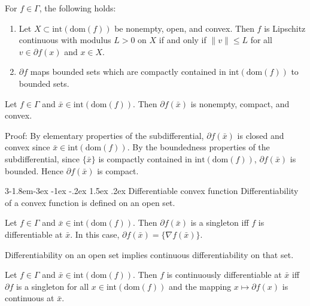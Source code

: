 \documentclass{tufte-handout}
\makeatletter
\renewcommand{\subsection}{\@startsection{subsection}%
    {3}{-1.8em}{-3ex \@plus -1ex \@minus -.2ex}%
    {1.5ex \@plus .2ex}
    {\hspace*{-5.5em}\fcolorbox{ltblue}{ltblue}{\parbox[c][1.0ex][b]{4em}{\phantom{space}}}
    \normalfont\large\itshape\color{ltblue}}}
\makeatother
\begin{document}
\begin{Theorem}
    For \( f\in \Gamma \), the following holds:
    \begin{enumerate}
        \item Let \(X \subset \text{int}(\text{dom}(f))\) be nonempty, open, and convex. Then \( f \)
        is Lipschitz continuous with modulus \( L >0 \) on \( X \) if and only if \( \|v\| \leq L \) for all 
        \( v \in \partial f(x) \) and \( x \in X \).
        \item \(\partial f\) maps bounded sets which are compactly contained in \( \text{int}(\text{dom}(f)) \) to bounded sets.
    \end{enumerate}
\end{Theorem}

\begin{Corollary}
    Let \( f\in \Gamma \) and \( \bar x \in \text{int}(\text{dom}(f)) \). Then \( \partial f(\bar x) \) is nonempty, compact, and convex.
\end{Corollary}
Proof: By elementary properties of the subdifferential, \( \partial f(\bar x) \) is closed and convex since 
\( \bar x \in \text{int}(\text{dom}(f)) \). By the boundedness properties of the subdifferential, 
since \( \{\bar x\} \) is compactly contained in \( \text{int}(\text{dom}(f)) \), 
\( \partial f(\bar x) \) is bounded. Hence \( \partial f(\bar x) \) is compact.
\hfill\qedsymbol


\subsection{Differentiable convex function}
Differentiability of a convex function is defined on an open set.
\begin{Theorem}
    Let \( f\in \Gamma \) and \( \bar x \in \text{int}(\text{dom}(f)) \). Then
    \( \partial f(\bar x) \) is a singleton iff \( f \) is differentiable at \( \bar x \). 
    In this case, \( \partial f(\bar x) = \{\nabla f(\bar x)\} \).
\end{Theorem}
Differentiability on an open set implies continuous differentiability on that set.
\begin{Theorem}
    Let \( f\in \Gamma \) and \( \bar x \in \text{int}(\text{dom}(f)) \). Then \( f \) is continuously
    differentiable at \( \bar x \) iff \( \partial f \) is a singleton for all \( x \in \text{int}(\text{dom}(f)) \) and the mapping \( x \mapsto \partial f(x) \) is continuous at \( \bar x \). 
\end{Theorem}
\end{document}
